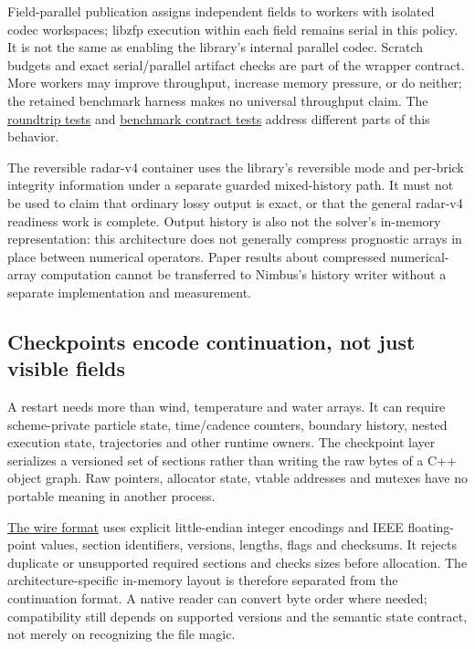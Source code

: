 Field-parallel publication assigns independent fields to workers with isolated
codec workspaces; libzfp execution within each field remains serial in this
policy. It is not the same as enabling the library's internal parallel codec.
Scratch budgets and exact serial/parallel artifact checks are part of the
wrapper contract. More workers may improve throughput, increase memory
pressure, or do neither; the retained benchmark harness makes no universal
throughput claim. The
\href{../tests/core/test_zfp_roundtrip.cpp}{roundtrip tests} and
\href{../tests/integration/test_zfp_field_parallel_benchmark.py}{benchmark
contract tests} address different parts of this behavior.

The reversible radar-v4 container uses the library's reversible mode and
per-brick integrity information under a separate guarded mixed-history path.
It must not be used to claim that ordinary lossy output is exact, or that the
general radar-v4 readiness work is complete. Output history is also not the
solver's in-memory representation: this architecture does not generally
compress prognostic arrays in place between numerical operators. Paper results
about compressed numerical-array computation cannot be transferred to Nimbus's
history writer without a separate implementation and measurement.

\subsection{Checkpoints encode continuation, not just visible fields}

A restart needs more than wind, temperature and water arrays. It can require
scheme-private particle state, time/cadence counters, boundary history, nested
execution state, trajectories and other runtime owners. The checkpoint layer
serializes a versioned set of sections rather than writing the raw bytes of a
C++ object graph. Raw pointers, allocator state, vtable addresses and mutexes
have no portable meaning in another process.

\href{../include/core/runtime/checkpoint_format.hpp}{The wire format} uses
explicit little-endian integer encodings and IEEE floating-point values,
section identifiers, versions, lengths, flags and checksums. It rejects
duplicate or unsupported required sections and checks sizes before allocation.
The architecture-specific in-memory layout is therefore separated from the
continuation format. A native reader can convert byte order where needed;
compatibility still depends on supported versions and the semantic state
contract, not merely on recognizing the file magic.

